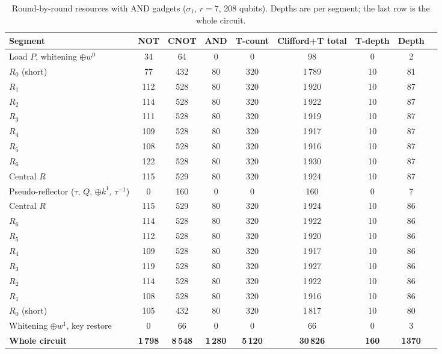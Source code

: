 \documentclass[runningheads,10pt]{llncs}
\begin{document}
\begin{table}[htbp]
\centering
\caption{Round-by-round resources with AND gadgets ($\sigma_1$, $r=7$, 208 qubits). Depths are per segment; the last row is the whole circuit.}
\label{tab:round-by-round}
\scriptsize
\begin{tabular}{lcccccccc}
\toprule
Segment & NOT & CNOT & AND & T-count & Clifford+T total & T-depth & Depth \\
\midrule
Load $P$, whitening $\oplus w^0$ & 34 & 64 & 0 & 0 & 98 & 0 & 2 \\
$R_0$ (short) & 77 & 432 & 80 & 320 & 1\,789 & 10 & 81 \\
$R_1$ & 112 & 528 & 80 & 320 & 1\,920 & 10 & 87 \\
$R_2$ & 114 & 528 & 80 & 320 & 1\,922 & 10 & 87 \\
$R_3$ & 111 & 528 & 80 & 320 & 1\,919 & 10 & 87 \\
$R_4$ & 109 & 528 & 80 & 320 & 1\,917 & 10 & 87 \\
$R_5$ & 108 & 528 & 80 & 320 & 1\,916 & 10 & 87 \\
$R_6$ & 122 & 528 & 80 & 320 & 1\,930 & 10 & 87 \\
Central $R$ & 115 & 529 & 80 & 320 & 1\,924 & 10 & 87 \\
Pseudo-reflector ($\tau$, $Q$, $\oplus k^1$, $\tau^{-1}$) & 0 & 160 & 0 & 0 & 160 & 0 & 7 \\
Central $R$ & 115 & 529 & 80 & 320 & 1\,924 & 10 & 86 \\
$R_6$ & 114 & 528 & 80 & 320 & 1\,922 & 10 & 86 \\
$R_5$ & 112 & 528 & 80 & 320 & 1\,920 & 10 & 86 \\
$R_4$ & 109 & 528 & 80 & 320 & 1\,917 & 10 & 86 \\
$R_3$ & 119 & 528 & 80 & 320 & 1\,927 & 10 & 86 \\
$R_2$ & 114 & 528 & 80 & 320 & 1\,922 & 10 & 86 \\
$R_1$ & 108 & 528 & 80 & 320 & 1\,916 & 10 & 86 \\
$R_0$ (short) & 105 & 432 & 80 & 320 & 1\,817 & 10 & 80 \\
Whitening $\oplus w^1$, key restore & 0 & 66 & 0 & 0 & 66 & 0 & 3 \\
\midrule
\textbf{Whole circuit} & \textbf{1\,798} & \textbf{8\,548} & \textbf{1\,280} & \textbf{5\,120} & \textbf{30\,826} & \textbf{160} & \textbf{1370} \\
\bottomrule
\end{tabular}
\end{table}
\end{document}
